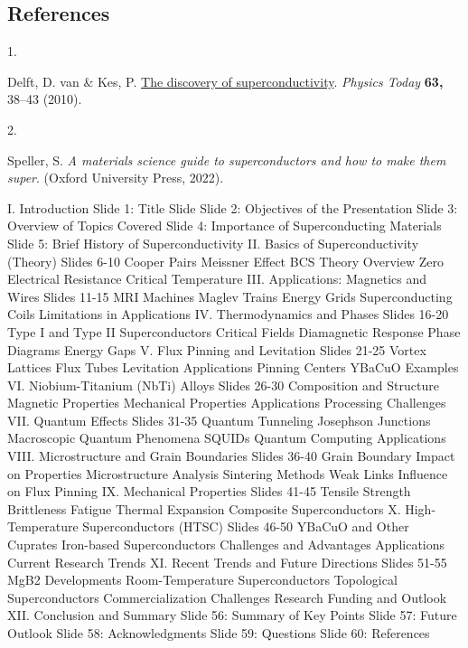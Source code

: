 \documentclass[
]{scrartcl}
\newlength{\cslhangindent}
\newlength{\csllabelwidth}
\newlength{\cslentryspacingunit} %
\newenvironment{CSLReferences}[2] %
 {%
  \setlength{\parindent}{0pt}
  \ifodd #1
  \let\oldpar\par
  \def\par{\hangindent=\cslhangindent\oldpar}
  \fi
  \setlength{\parskip}{#2\cslentryspacingunit}
 }%
 {}
\newcommand{\CSLLeftMargin}[1]{\parbox[t]{\csllabelwidth}{#1}}
\newcommand{\CSLRightInline}[1]{\parbox[t]{\linewidth - \csllabelwidth}{#1}\break}
\begin{document}
\hypertarget{references}{%
\subsection{References}\label{references}}

\hypertarget{refs}{}
\begin{CSLReferences}{0}{0}
\leavevmode{}%
\CSLLeftMargin{1. }%
\CSLRightInline{Delft, D. van \& Kes, P.
\href{https://doi.org/10.1063/1.3490499}{{The discovery of
superconductivity}}. \emph{Physics Today} \textbf{63,} 38--43 (2010).}

\leavevmode{}%
\CSLLeftMargin{2. }%
\CSLRightInline{Speller, S. \emph{A materials science guide to
superconductors and how to make them super}. (Oxford University Press,
2022).}

\end{CSLReferences}

I. Introduction Slide 1: Title Slide Slide 2: Objectives of the
Presentation Slide 3: Overview of Topics Covered Slide 4: Importance of
Superconducting Materials Slide 5: Brief History of Superconductivity
II. Basics of Superconductivity (Theory) Slides 6-10 Cooper Pairs
Meissner Effect BCS Theory Overview Zero Electrical Resistance Critical
Temperature III. Applications: Magnetics and Wires Slides 11-15 MRI
Machines Maglev Trains Energy Grids Superconducting Coils Limitations in
Applications IV. Thermodynamics and Phases Slides 16-20 Type I and Type
II Superconductors Critical Fields Diamagnetic Response Phase Diagrams
Energy Gaps V. Flux Pinning and Levitation Slides 21-25 Vortex Lattices
Flux Tubes Levitation Applications Pinning Centers YBaCuO Examples VI.
Niobium-Titanium (NbTi) Alloys Slides 26-30 Composition and Structure
Magnetic Properties Mechanical Properties Applications Processing
Challenges VII. Quantum Effects Slides 31-35 Quantum Tunneling Josephson
Junctions Macroscopic Quantum Phenomena SQUIDs Quantum Computing
Applications VIII. Microstructure and Grain Boundaries Slides 36-40
Grain Boundary Impact on Properties Microstructure Analysis Sintering
Methods Weak Links Influence on Flux Pinning IX. Mechanical Properties
Slides 41-45 Tensile Strength Brittleness Fatigue Thermal Expansion
Composite Superconductors X. High-Temperature Superconductors (HTSC)
Slides 46-50 YBaCuO and Other Cuprates Iron-based Superconductors
Challenges and Advantages Applications Current Research Trends XI.
Recent Trends and Future Directions Slides 51-55 MgB2 Developments
Room-Temperature Superconductors Topological Superconductors
Commercialization Challenges Research Funding and Outlook XII.
Conclusion and Summary Slide 56: Summary of Key Points Slide 57: Future
Outlook Slide 58: Acknowledgments Slide 59: Questions Slide 60:
References
\end{document}
